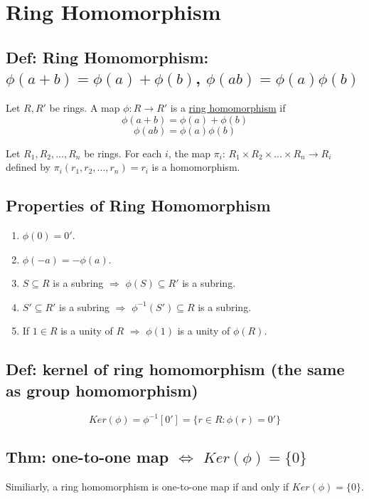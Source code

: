 \documentclass[11pt]{elegantbook}
\begin{document}
\section{Ring Homomorphism}
\subsection{Def: Ring Homomorphism: $\phi(a+b)=\phi(a)+\phi(b)$, $\phi(ab)=\phi(a)\phi(b)$}
\begin{definition}
    Let $R,R'$ be rings. A map $\phi:R \rightarrow R'$ is a \underline{ring homomorphism} if $$\phi(a+b)=\phi(a)+\phi(b)$$ $$\phi(ab)=\phi(a)\phi(b)$$
\end{definition}

\begin{example}
    Let $R_1,R_2,...,R_n$ be rings. For each $i$, the map $\pi_i$: $R_1\times R_2\times ...\times R_n \rightarrow R_i$ defined by $\pi_i(r_1,r_2,...,r_n)=r_i$ is a homomorphism.
\end{example}

\subsection{Properties of Ring Homomorphism}
\begin{enumerate}
    \item $\phi(0)=0'$.
    \item $\phi(-a)=-\phi(a)$.
    \item $S\subseteq R$ is a subring $\Rightarrow$ $\phi(S)\subseteq R'$ is a subring.
    \item $S'\subseteq R'$ is a subring $\Rightarrow$ $\phi^{-1}(S')\subseteq R$ is a subring.
    \item If $1\in R$ is a unity of $R$ $\Rightarrow$ $\phi(1)$ is a unity of $\phi(R)$.
\end{enumerate}

\subsection{Def: kernel of ring homomorphism (the same as group homomorphism)}
$$Ker(\phi)=\phi^{-1}[0']=\{r\in R: \phi(r)=0'\}$$

\subsection{Thm: one-to-one map $\Leftrightarrow$ $Ker(\phi)=\{0\}$}
Similiarly, a ring homomorphism is one-to-one map if and only if $Ker(\phi)=\{0\}$.
\end{document}
